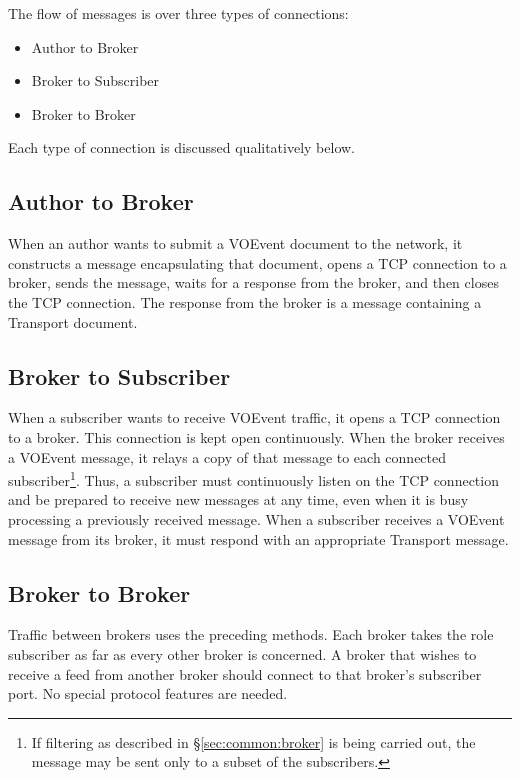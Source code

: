 \documentclass[a4paper,11pt]{ivoa}
\begin{document}
The flow of messages is over three types of connections:

\begin{itemize}
    \item{Author to Broker}
    \item{Broker to Subscriber}
    \item{Broker to Broker}
\end{itemize}

Each type of connection is discussed qualitatively below.

\subsection{Author to Broker}

When an author wants to submit a VOEvent document to the network, it
constructs a message encapsulating that document, opens a TCP connection to a
broker, sends the message, waits for a response from the broker, and then
closes the TCP connection. The response from the broker is a message
containing a Transport document.

\subsection{Broker to Subscriber}

When a subscriber wants to receive VOEvent traffic, it opens a TCP connection
to a broker. This connection is kept open continuously. When the broker
receives a VOEvent message, it relays a copy of that message to each connected
subscriber\footnote{If filtering as described in \S\ref{sec:common:broker} is
being carried out, the message may be sent only to a subset of the
subscribers.}.  Thus, a subscriber must continuously listen on the TCP
connection and be prepared to receive new messages at any time, even when it
is busy processing a previously received message. When a subscriber receives a
VOEvent message from its broker, it must respond with an appropriate Transport
message.

\subsection{Broker to Broker}
\label{sec:node:brokertobroker}

Traffic between brokers uses the preceding methods. Each broker takes the role
subscriber as far as every other broker is concerned. A broker that wishes to
receive a feed from another broker should connect to that broker's subscriber
port. No special protocol features are needed.
\end{document}
